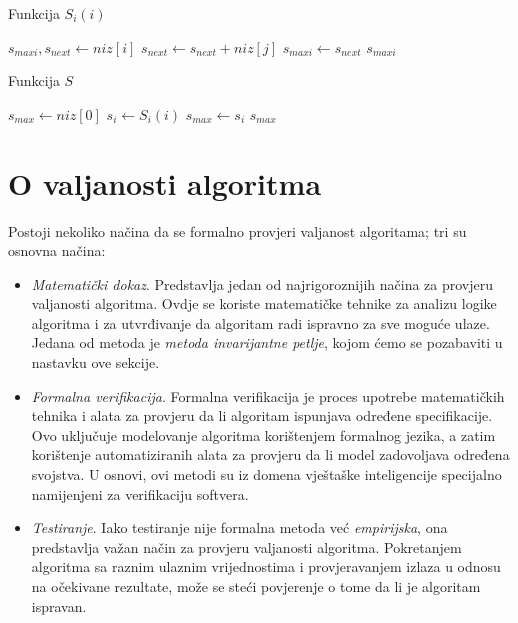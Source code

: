 

 \begin{algorithm}[!ht]
 	\caption{Funkcija $S_i(i)$}\label{S_i}
 	\begin{algorithmic}[1]
 		\State $s_{maxi}, s_{next} \gets niz[i]$
 		\State $s_{next} \gets s_{next} + niz[j]$
 		\State $s_{maxi} \gets s_{next}$
 		\EndIf
 		\EndFor  
 		\State \Return $s_{maxi}$
 		\EndProcedure
 	\end{algorithmic}
 \end{algorithm}



\begin{algorithm}[H]
	\caption{Funkcija $S$}\label{S}
	\begin{algorithmic}[1]
		\State $s_{max}\gets niz[0]$ 
		\State $s_i \gets  S_i(i)$ 
		    \State $s_{max} \gets s_{i}$
		  \EndIf
		\EndFor  
		\State  \Return  $s_{max}$
		\EndProcedure
	\end{algorithmic}
\end{algorithm}

\section{O valjanosti algoritma}

Postoji nekoliko načina da se formalno provjeri valjanost algoritama; tri  su osnovna načina:

\begin{itemize}
	\item \textit{Matematički dokaz}. Predstavlja jedan od najrigoroznijih načina za provjeru valjanosti algoritma.  %
	Ovdje se koriste matematičke tehnike za analizu logike algoritma i za utvrđivanje da algoritam radi ispravno za sve moguće ulaze. Jedana od metoda je \textit{metoda invarijantne petlje}, kojom ćemo se pozabaviti u nastavku ove sekcije. 
	
    \item \textit{Formalna verifikacija}. Formalna verifikacija je proces upotrebe matematičkih tehnika i alata za provjeru da li algoritam ispunjava određene specifikacije. Ovo uključuje modelovanje algoritma korištenjem formalnog jezika, a zatim korištenje automatiziranih alata za provjeru da li model zadovoljava određena svojstva. U osnovi, ovi metodi su iz domena vještaške inteligencije specijalno namijenjeni za verifikaciju softvera.
    \item \textit{Testiranje}.  Iako testiranje nije formalna metoda već \textit{empirijska}, ona predstavlja važan način za provjeru valjanosti algoritma. Pokretanjem algoritma sa raznim ulaznim vrijednostima i provjeravanjem izlaza u odnosu na očekivane rezultate, može se steći povjerenje o tome da li je algoritam ispravan.

\end{itemize}


